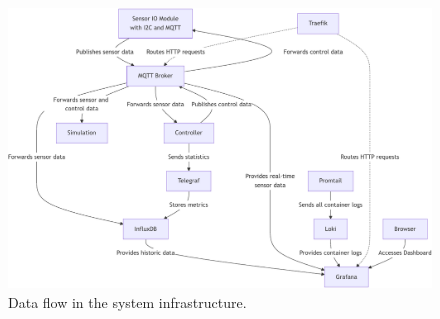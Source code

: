 \begin{figure}
    \centering
    \includegraphics[width=\textwidth]{figures/diagrams/infrastructure-robot-controller}
    \caption{Data flow in the system infrastructure.}
    \label{fig:data_flow}
\end{figure}

